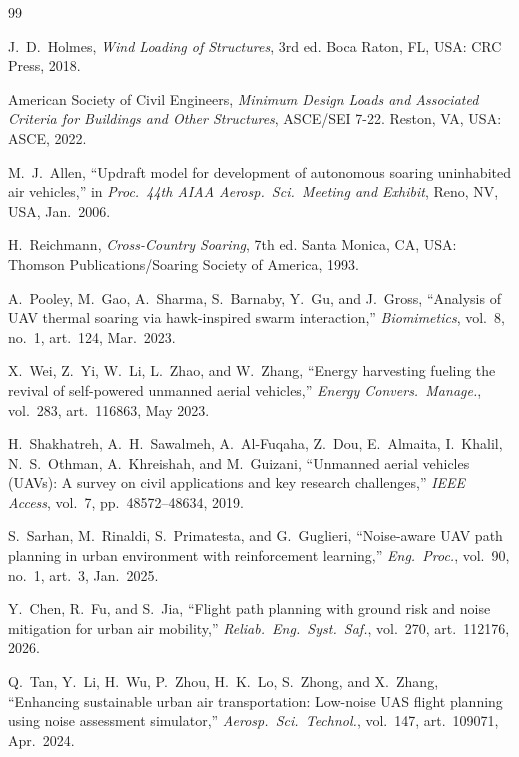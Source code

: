 \documentclass[conference]{IEEEtran}
\begin{document}
\begin{thebibliography}{99}
\footnotesize

J.\ D.\ Holmes, \emph{Wind Loading of Structures}, 3rd ed.
Boca Raton, FL, USA: CRC Press, 2018.

American Society of Civil Engineers, \emph{Minimum Design Loads and
Associated Criteria for Buildings and Other Structures}, ASCE/SEI 7-22.
Reston, VA, USA: ASCE, 2022.

M.\ J.\ Allen, ``Updraft model for development of autonomous soaring
uninhabited air vehicles,'' in \emph{Proc.\ 44th AIAA Aerosp.\ Sci.\ Meeting and
Exhibit}, Reno, NV, USA, Jan.\ 2006.

H.\ Reichmann, \emph{Cross-Country Soaring}, 7th ed. Santa Monica, CA, USA:
Thomson Publications/Soaring Society of America, 1993.

A.\ Pooley, M.\ Gao, A.\ Sharma, S.\ Barnaby, Y.\ Gu, and J.\ Gross,
``Analysis of UAV thermal soaring via hawk-inspired swarm interaction,''
\emph{Biomimetics}, vol.~8, no.~1, art.~124, Mar.\ 2023.

X.\ Wei, Z.\ Yi, W.\ Li, L.\ Zhao, and W.\ Zhang, ``Energy harvesting fueling
the revival of self-powered unmanned aerial vehicles,'' \emph{Energy Convers.\
Manage.}, vol.~283, art.~116863, May 2023.

H.\ Shakhatreh, A.\ H.\ Sawalmeh, A.\ Al-Fuqaha, Z.\ Dou, E.\ Almaita,
I.\ Khalil, N.\ S.\ Othman, A.\ Khreishah, and M.\ Guizani, ``Unmanned
aerial vehicles (UAVs): A survey on civil applications and key research
challenges,'' \emph{IEEE Access}, vol.~7, pp.~48572--48634, 2019.

S.\ Sarhan, M.\ Rinaldi, S.\ Primatesta, and G.\ Guglieri, ``Noise-aware
UAV path planning in urban environment with reinforcement learning,''
\emph{Eng.\ Proc.}, vol.~90, no.~1, art.~3, Jan.\ 2025.

Y.\ Chen, R.\ Fu, and S.\ Jia, ``Flight path planning with ground risk and
noise mitigation for urban air mobility,'' \emph{Reliab.\ Eng.\ Syst.\ Saf.}, vol.~270,
art.~112176, 2026.

Q.\ Tan, Y.\ Li, H.\ Wu, P.\ Zhou, H.\ K.\ Lo, S.\ Zhong, and X.\ Zhang,
``Enhancing sustainable urban air transportation: Low-noise UAS flight
planning using noise assessment simulator,'' \emph{Aerosp.\ Sci.\ Technol.},
vol.~147, art.~109071, Apr.\ 2024.


\end{thebibliography}
\end{document}
